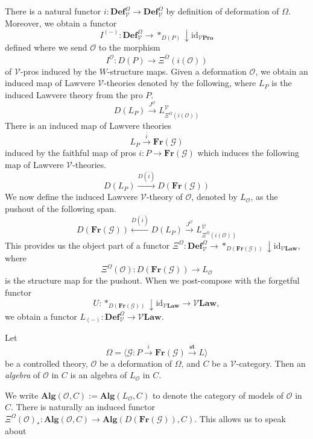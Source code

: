 \documentclass{tac}
\begin{document}
There is a natural functor $i:\mathbf{Def}^{\Omega}_\mathcal{V}\to \mathbf{Def}^{\overline{\Omega}}_\mathcal{V}$ by definition of deformation of $\Omega$. Moreover, we obtain a functor 
\[
I^{(-)}:\mathbf{Def}^{\Omega}_\mathcal{V}\to *_{D(P)}\downarrow \text{id}_{\mathcal{V}\mathbf{Pro}}
\]
defined where we send $\mathcal{O}$ to the morphism 
\[
I^\mathcal{O}:D(P)\to \Xi^{\overline{\Omega}}(i(\mathcal{O}))
\]
of $\mathcal{V}$-pros induced by the $W$-structure maps. Given a deformation $\mathcal{O}$, we obtain an induced map of Lawvere $\mathcal{V}$-theories denoted by the following, where $L_P$ is the induced Lawvere theory from the pro $P$.
   \[
   D(L_P)\xrightarrow{J^\mathcal{O}}L^\mathcal{V}_{\Xi^{\overline{\Omega}}(i(\mathcal{O}))}
   \]
   There is an induced map of Lawvere theories 
   \[
   L_P\xrightarrow{\overline{i}}\mathbf{Fr}(\mathcal{G})
   \]
   induced by the faithful map of pros $i:P\to\mathbf{Fr}(\mathcal{G})$ which induces the following map of Lawvere $\mathcal{V}$-theories.
   \[
   D(L_P)\xrightarrow{D(\overline{i})}D(\mathbf{Fr}(\mathcal{G}))
   \]
   We now define the induced Lawvere $\mathcal{V}$-theory of $\mathcal{O}$, denoted by $L_{\mathcal{O}}$, as the pushout of the following span.
   \[
D(\mathbf{Fr}(\mathcal{G}))\xleftarrow{D(\overline{i})}D(L_P)\xrightarrow{J^\mathcal{O}}L^\mathcal{V}_{\Xi^{\overline{\Omega}}(i(\mathcal{O}))}
   \]
This provides us the object part of a functor $\Xi^\Omega:\mathbf{Def}^{\Omega}_\mathcal{V}\to *_{D(\mathbf{Fr}(\mathcal{G}))}\downarrow \text{id}_{\mathcal{V}\mathbf{Law}}$, where 
\[
\Xi^\Omega(\mathcal{O}):D(\mathbf{Fr}(\mathcal{G}))\to L_{\mathcal{O}}
\]
is the structure map for the pushout. When we post-compose with the forgetful functor 
\[
U:*_{D(\mathbf{Fr}(\mathcal{G}))}\downarrow \text{id}_{\mathcal{V}\mathbf{Law}}\to \mathcal{V}\mathbf{Law},
\]
we obtain a functor $L_{(-)}:\mathbf{Def}^{\Omega}_\mathcal{V}\to \mathcal{V}\mathbf{Law}$. 

\begin{definition}
Let 
\[
\Omega=\langle \mathcal{G}:P\xrightarrow{i}\mathbf{Fr}(\mathcal{G})\xrightarrow{\mathbf{st}}L\rangle
\]
be a controlled theory, $\mathcal{O}$ be a deformation of $\Omega$, and $C$ be a $\mathcal{V}$-category. Then an \emph{algebra} of $\mathcal{O}$ in $C$ is an algebra of $L_{\mathcal{O}}$ in $C$.
\end{definition}

We write $\mathbf{Alg}(\mathcal{O},C):=\mathbf{Alg}(L_\mathcal{O},C)$ to denote the category of models of $\mathcal{O}$ in $C$. There is naturally an induced functor $\Xi^\Omega(\mathcal{O})_*:\mathbf{Alg}(\mathcal{O},C)\to\mathbf{Alg}(D(\mathbf{Fr}(\mathcal{G})),C)$. This allows us to speak about 
\end{document}
